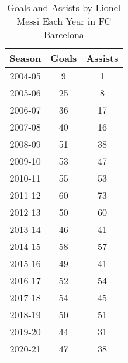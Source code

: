 \begin{table}[ht!]
    \centering
    \caption{Goals and Assists by Lionel Messi Each Year in FC Barcelona}
    \begin{tabular}{ccc}
      \hline
      Season & Goals & Assists \\ \hline
      2004-05 & 9 & 1 \\
      2005-06 & 25 & 8 \\
      2006-07 & 36 & 17 \\
      2007-08 & 40 & 16 \\
      2008-09 & 51 & 38 \\
      2009-10 & 53 & 47 \\
      2010-11 & 55 & 53 \\
      2011-12 & 60 & 73 \\
      2012-13 & 50 & 60 \\
      2013-14 & 46 & 41 \\
      2014-15 & 58 & 57 \\
      2015-16 & 49 & 41 \\
      2016-17 & 52 & 54 \\
      2017-18 & 54 & 45 \\
      2018-19 & 50 & 51 \\
      2019-20 & 44 & 31 \\
      2020-21 & 47 & 38 \\
    \hline
    \end{tabular}
    \label{tab:messi_barca_goals_assists}
\end{table}
  
